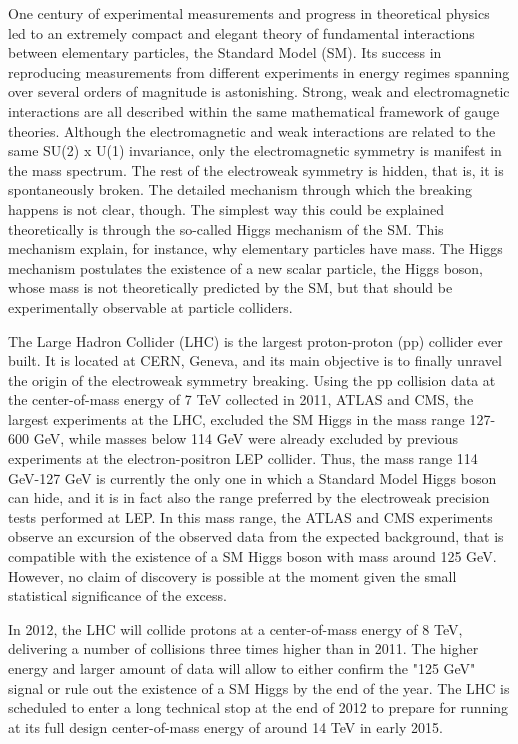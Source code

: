 \documentclass[10pt, a4paper]{article}
\begin{document}
One century of experimental measurements and progress in theoretical physics led to an extremely compact and elegant theory of fundamental interactions between elementary particles, the Standard Model (SM). Its success in reproducing measurements from different experiments in energy regimes spanning over several orders of magnitude is astonishing. Strong, weak and electromagnetic interactions are all described within the same mathematical framework of gauge theories. Although the electromagnetic and weak interactions are related to the same SU(2) x U(1) invariance, only the electromagnetic symmetry is manifest in the mass spectrum. The rest of the electroweak symmetry is hidden, that is, it is spontaneously broken. 
The detailed mechanism through which the breaking happens is not clear, though. The simplest way this could be explained theoretically is through the so-called Higgs mechanism of the SM. This mechanism explain, for instance, why elementary particles have mass. The Higgs mechanism postulates the existence of a new scalar particle, the Higgs boson, whose mass is not theoretically predicted by the SM, but that should be experimentally observable at particle colliders. 

The Large Hadron Collider (LHC) is the largest proton-proton (pp) collider ever built. It is located at CERN, Geneva, and its main objective is to finally unravel the origin of the electroweak symmetry breaking. Using the pp collision data at the center-of-mass energy of 7 TeV collected in 2011, ATLAS and CMS, the largest experiments at the LHC, excluded the SM Higgs in the mass range 127-600 GeV, while masses below 114 GeV were already excluded by previous experiments at the electron-positron LEP collider. Thus, the mass range 114 GeV-127 GeV is currently the only one in which a Standard Model Higgs boson can hide, and it is in fact also the range preferred by the electroweak precision tests performed at LEP. In this mass range, the ATLAS and CMS experiments observe an excursion of the observed data from the expected background, that is compatible with the existence of a SM Higgs boson with mass around 125 GeV. However, no claim of discovery is possible at the moment given the small statistical significance of the excess. 

In 2012, the LHC will collide protons at a center-of-mass energy of 8 TeV, delivering a number of collisions three times higher than in 2011. The higher energy and larger amount of data will allow to either confirm the "125 GeV" signal or rule out the existence of a SM Higgs by the end of the year. The LHC is scheduled to enter a long technical stop at the end of 2012 to prepare for running at its full design center-of-mass energy of around 14 TeV in early 2015.
\end{document}
